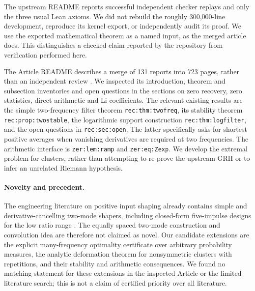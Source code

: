 \documentclass[11pt]{article}
\theoremstyle{remark}\newtheorem{remark}[theorem]{Remark}
\begin{document}
The upstream README reports successful independent checker replays and only the three usual Lean axioms. We did not rebuild the roughly 300,000-line development, reproduce its kernel export, or independently audit its proof. We use the exported mathematical theorem as a named input, as the merged article does. This distinguishes a checked claim reported by the repository from verification performed here.

The Article README describes a merge of 131 reports into 723 pages, rather than an independent review \cite{article}. We inspected its introduction, theorem and subsection inventories and open questions in the sections on zero recovery, zero statistics, direct arithmetic and Li coefficients. The relevant existing results are the simple two-frequency filter theorem \texttt{rec:thm:twofreq}, its stability theorem \texttt{rec:prop:twostable}, the logarithmic support construction \texttt{rec:thm:logfilter}, and the open questions in \texttt{rec:sec:open}. The latter specifically asks for shortest positive averages when vanishing derivatives are required at two frequencies. The arithmetic interface is \texttt{zer:lem:ramp} and \texttt{zer:eq:Zexp}. We develop the extremal problem for clusters, rather than attempting to re-prove the upstream GRH or to infer an unrelated Riemann hypothesis.

\paragraph{Novelty and precedent.} The engineering literature on positive input shaping already contains simple and derivative-cancelling two-mode shapers, including closed-form five-impulse designs for the low ratio range \cite{command,trolley}. The equally spaced two-mode construction and convolution idea are therefore not claimed as novel. Our candidate extensions are the explicit many-frequency optimality certificate over arbitrary probability measures, the analytic deformation theorem for nonsymmetric clusters with repetitions, and their stability and arithmetic consequences. We found no matching statement for these extensions in the inspected Article or the limited literature search; this is not a claim of certified priority over all literature.
\end{document}
